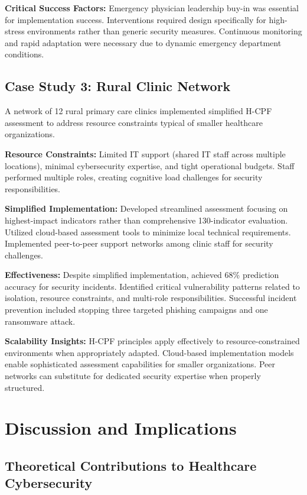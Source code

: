 \documentclass[10pt, twocolumn]{article}
\begin{document}
\textbf{Critical Success Factors:} Emergency physician leadership buy-in was essential for implementation success. Interventions required design specifically for high-stress environments rather than generic security measures. Continuous monitoring and rapid adaptation were necessary due to dynamic emergency department conditions.

\subsection{Case Study 3: Rural Clinic Network}

A network of 12 rural primary care clinics implemented simplified H-CPF assessment to address resource constraints typical of smaller healthcare organizations.

\textbf{Resource Constraints:} Limited IT support (shared IT staff across multiple locations), minimal cybersecurity expertise, and tight operational budgets. Staff performed multiple roles, creating cognitive load challenges for security responsibilities.

\textbf{Simplified Implementation:} Developed streamlined assessment focusing on highest-impact indicators rather than comprehensive 130-indicator evaluation. Utilized cloud-based assessment tools to minimize local technical requirements. Implemented peer-to-peer support networks among clinic staff for security challenges.

\textbf{Effectiveness:} Despite simplified implementation, achieved 68\% prediction accuracy for security incidents. Identified critical vulnerability patterns related to isolation, resource constraints, and multi-role responsibilities. Successful incident prevention included stopping three targeted phishing campaigns and one ransomware attack.

\textbf{Scalability Insights:} H-CPF principles apply effectively to resource-constrained environments when appropriately adapted. Cloud-based implementation models enable sophisticated assessment capabilities for smaller organizations. Peer networks can substitute for dedicated security expertise when properly structured.

\section{Discussion and Implications}

\subsection{Theoretical Contributions to Healthcare Cybersecurity}
\end{document}
